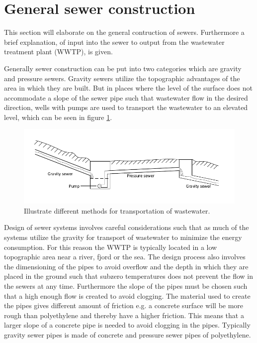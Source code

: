 \section{General sewer construction}\label{se:sewer_construction}
This section will elaborate on the general contruction of sewers. Furthermore a brief explanation, of input into the sewer to output from the wastewater treatment plant (WWTP), is given.


Generally sewer construction can be put into two categories which are gravity and pressure sewers. Gravity sewers utilize the topographic advantages of the area in which they are built. But in places where the level of the surface does not accommodate a slope of the sewer pipe such that wastewater flow in the desired direction, wells with pumps are used to transport the wastewater to an elevated level, which can be seen in figure \ref{fig:Sewer_drawing}. 

\begin{figure}[H]
\centering
\includegraphics[width=1\textwidth]{report/introduction/pictures/Sewer_drawing.pdf}
\caption{Illustrate different methods for transportation of wastewater.}
\label{fig:Sewer_drawing}
\end{figure}

Design of sewer systems involves careful considerations such that as much of the systems utilize the gravity for transport of wastewater to minimize the energy consumption. For this reason the WWTP is typically located in a low topographic area near a river, fjord or the sea. The design process also involves the dimensioning of the pipes to avoid overflow and the depth in which they are placed in the ground such that subzero temperatures does not prevent the flow in the sewers at any time. Furthermore the slope of the pipes must be chosen such that a high enough flow is created to avoid clogging. The material used to create the pipes gives different amount of friction e.g. a concrete surface will be more rough than polyethylene and thereby have a higher friction. This means that a larger slope of a concrete pipe is needed to avoid clogging in the pipes. Typically gravity sewer pipes is made of concrete and pressure sewer pipes of polyethylene.


